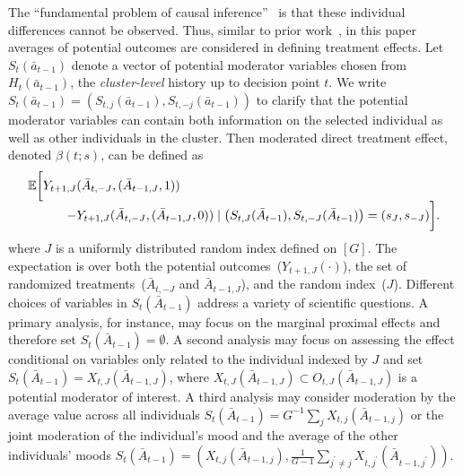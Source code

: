 \documentclass[12pt]{article}
\newcommand{\zw}[1]{\textcolor{blue}{[\textit{ZW: #1}]}}
\begin{document}
The ``fundamental problem of causal inference''~\citep{Rubin, Pearl2009} is that these individual differences cannot be observed. Thus, similar to prior work~\citep{DempseyAOAS, Boruvkaetal}, in this paper averages of potential outcomes are considered in defining treatment effects. Let $S_t (\bar a_{t-1})$ denote a vector of potential moderator variables chosen from $H_t (\bar a_{t-1})$, the \emph{cluster-level} history up to decision point $t$.  We write $S_t (\bar a_{t-1}) = \left( S_{t,j} (\bar a_{t-1}), S_{t,-j} (\bar a_{t-1}) \right)$ to clarify that the potential moderator variables can contain both information on the selected individual as well as other individuals in the cluster. Then moderated direct treatment effect, denoted $\beta (t; s)$, can be defined as
\begin{equation}
\label{eq:directavglineareffect}
\begin{array}{r@{}l}
\mathbb{E} \bigg[ Y_{t+1,J} &(\bar A_{t,-J}, (\bar A_{t-1,J}, 1)) \\
- &Y_{t+1,J} (\bar A_{t,-J}, (\bar A_{t-1,J}, 0)) \mid \left( S_{t,J} (\bar A_{t-1}), S_{t,-J} (\bar A_{t-1}) \right) = (s_J, s_{-J}) \bigg].
\end{array}
\end{equation}
where $J$ is a uniformly distributed random index defined on $[G]$. The expectation is over both the potential outcomes~($Y_{t+1,J}(\cdot)$), the set of randomized treatments~($\bar A_{t,-J}$ and $\bar A_{t-1,J}$), and the random index~($J$).
Different choices of variables in $S_t (\bar A_{t-1})$ address a variety of scientific questions.  A primary analysis, for instance, may focus on the marginal proximal effects and therefore set $S_t (\bar A_{t-1}) = \emptyset$.  A second analysis may focus on assessing the effect conditional on variables only related to the individual indexed by $J$ and set $S_t (\bar A_{t-1}) = X_{t,J} (\bar A_{t-1,J})$, where $X_{t,J} (\bar A_{t-1,J}) \subset O_{t,J} (\bar A_{t-1,J})$ is a potential moderator of interest.  A third analysis may consider moderation by the average value across all individuals $S_t (\bar A_{t-1}) = G^{-1} \sum_j X_{t,j} (\bar A_{t-1,j})$ or the joint moderation of the individual's mood and the average of the other individuals' moods $S_t (\bar A_{t-1}) = \left( X_{t,j}(\bar A_{t-1,j}), \frac{1}{G-1} \sum_{j^\prime \neq j} X_{t,j^\prime} (\bar A_{t-1,j^\prime}) \right)$.
\end{document}
